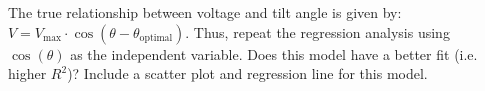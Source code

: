 \documentclass[11pt,twoside]{article}
\numberwithin{equation}{section}
\newcommand{\?}{\stackrel{?}{=}}
\begin{document}
The true relationship between voltage and tilt angle is given by: $V = V_{\text{max}} \cdot \cos(\theta - \theta_{\text{optimal}})$. Thus, repeat the regression analysis using $\cos(\theta)$ as the independent variable.
Does this model have a better fit (i.e. higher $R^2$)? Include a scatter plot and regression line for this model.











\end{document}
